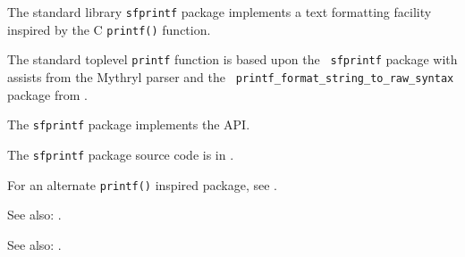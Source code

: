 
The standard library {\tt sfprintf} package implements a text formatting facility inspired 
by the C {\tt printf()} function.

The standard toplevel {\tt printf} function is based upon the {\tt 
sfprintf} package with assists from the Mythryl parser and the {\tt 
printf\_format\_string\_to\_raw\_syntax} package from 
.

The {\tt sfprintf} package implements the  API.

The {\tt sfprintf} package source code is in .

For an alternate {\tt printf()} inspired package, see .

See also:  .

See also:  .
